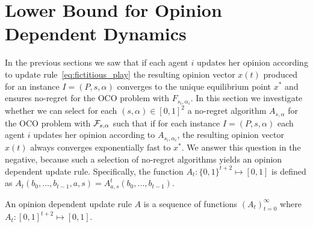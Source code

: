 \section{Lower Bound for Opinion Dependent Dynamics}\label{s:lower_bound}

In the previous sections we saw that if each
agent $i$ updates her opinion according to
update rule~\ref{eq:fictitious_play}
the resulting opinion vector $x(t)$ produced
for an instance $I=(P,s,\alpha)$ converges
to the unique equilibrium point $x^*$ and
ensures no-regret for the OCO problem 
with $F_{s_i,\alpha_i}$. In this section we investigate whether we
can select
for each $(s,\alpha) \in [0,1]^2$ a no-regret algorithm
$A_{s,\alpha}$ for the OCO problem with 
$\mathcal{F}_{s,\alpha}$ such that if for each instance
$I=(P,s,\alpha)$ each agent $i$ updates her 
opinion according to $A_{s_i,\alpha_i}$,
the resulting opinion vector $x(t)$ always converges 
exponentially fast to $x^*$.
We answer this question in the negative, 
because such a selection of no-regret algorithms yields an
opinion dependent update rule. Specifically, the function
$A_t:\{0,1\}^{t+2} \mapsto [0,1]$ is defined
as $A_t(b_0,\ldots,b_{t-1},a,s) = A^t_{a,s}(b_0,\ldots,b_{t-1})$.


\begin{definition}\label{d:opinion_dependent_dynamics}
An opinion dependent update rule $A$ is a sequence of 
functions $(A_t)_{t=0}^\infty$ where
$A_t: [0,1]^{t+2}\mapsto [0,1]$.
\end{definition}

